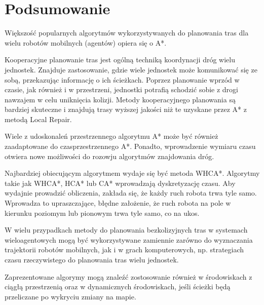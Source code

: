 \chapter{Podsumowanie}
\label{ch:podsumowanie}

Większość popularnych algorytmów wykorzystywanych do planowania tras dla wielu robotów mobilnych (agentów) opiera się o A*.

Kooperacyjne planowanie tras jest ogólną techniką koordynacji dróg wielu jednostek.
Znajduje zastosowanie, gdzie wiele jednostek może komunikować się ze sobą, przekazując informację o ich ścieżkach.
Poprzez planowanie wprzód w czasie, jak również i w przestrzeni, jednostki potrafią schodzić sobie z drogi nawzajem w celu uniknięcia kolizji.
Metody kooperacyjnego planowania są bardziej skuteczne i znajdują trasy wyższej jakości niż te uzyskane przez A* z metodą Local Repair.

Wiele z udoskonaleń przestrzennego algorytmu A* może być również zaadaptowane do czasprzestrzennego A*.
Ponadto, wprowadzenie wymiaru czasu otwiera nowe możliwości do rozowju algorytmów znajdowania dróg.

Najbardziej obiecującym algorytmem wydaje się być metoda WHCA*.
Algorytmy takie jak WHCA*, HCA* lub CA* wprowadzają dyskretyzację czasu.
Aby wydajnie prowadzić obliczenia, zakłada się, że każdy ruch robota trwa tyle samo. 
Wprowadza to upraszczające, błędne założenie, że ruch robota na pole w kierunku poziomym lub pionowym trwa tyle samo, co na ukos.

W wielu przypadkach metody do planowania bezkolizyjnych tras w systemach wieloagentowych mogą być wykorzystywane zamiennie zarówno do wyznaczania trajektorii robotów mobilnych, jak i w grach komputerowych, np. strategiach czasu rzeczywistego do planowania tras wielu jednostek.

Zaprezentowane algorymy mogą znaleźć zostosowanie również w środowiskach z ciągłą przestrzenią oraz w dynamicznych środowiskach, jeśli ścieżki będą przeliczane po wykryciu zmiany na mapie.
